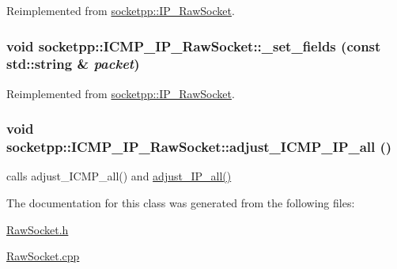 Reimplemented from \hyperlink{classsocketpp_1_1IP__RawSocket_6863cc399c543073e9aa3615c3f50940}{socketpp::IP\_\-RawSocket}.\hypertarget{classsocketpp_1_1ICMP__IP__RawSocket_6d2f188d46030afa13f9c3971d43d518}{
\subsubsection[{\_\-set\_\-fields}]{\setlength{\rightskip}{0pt plus 5cm}void socketpp::ICMP\_\-IP\_\-RawSocket::\_\-set\_\-fields (const std::string \& {\em packet})}}
\label{classsocketpp_1_1ICMP__IP__RawSocket_6d2f188d46030afa13f9c3971d43d518}




Reimplemented from \hyperlink{classsocketpp_1_1IP__RawSocket_c39832f1ad83184cd5ba94c4c967f465}{socketpp::IP\_\-RawSocket}.\hypertarget{classsocketpp_1_1ICMP__IP__RawSocket_c3f54f7a266586af46e4bfa4494f90d6}{
\subsubsection[{adjust\_\-ICMP\_\-IP\_\-all}]{\setlength{\rightskip}{0pt plus 5cm}void socketpp::ICMP\_\-IP\_\-RawSocket::adjust\_\-ICMP\_\-IP\_\-all ()}}
\label{classsocketpp_1_1ICMP__IP__RawSocket_c3f54f7a266586af46e4bfa4494f90d6}


calls adjust\_\-ICMP\_\-all() and \hyperlink{classsocketpp_1_1IP__RawSocket_45e60510233daaa2f279d3a4706fdce5}{adjust\_\-IP\_\-all()} 



The documentation for this class was generated from the following files:\begin{CompactItemize}
\item 
\hyperlink{RawSocket_8h}{RawSocket.h}\item 
\hyperlink{RawSocket_8cpp}{RawSocket.cpp}\end{CompactItemize}
